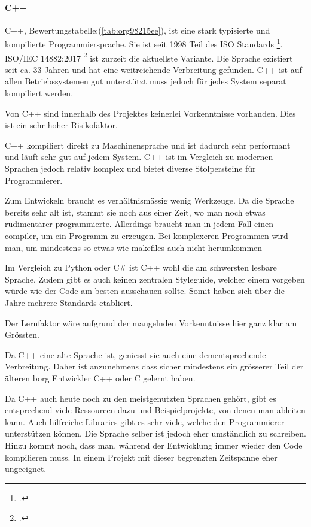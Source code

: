 \newpage
\paragraph{C++}
\label{sec:orga42458f}

C++, Bewertungstabelle:(\ref{tab:org98215ee}), ist eine stark typisierte und kompilierte Programmiersprache. Sie ist seit
1998 Teil des ISO Standards \footcite{cpp98}. ISO/IEC 14882:2017 \footcite{cpp17}
ist zurzeit die aktuellste Variante. Die Sprache existiert seit ca. 33 Jahren
und hat eine weitreichende Verbreitung gefunden. C++ ist auf allen
Betriebssystemen gut unterstützt muss jedoch für jedes System separat
kompiliert werden.

Von C++ sind innerhalb des Projektes keinerlei Vorkenntnisse vorhanden. Dies
ist ein sehr hoher Risikofaktor.

C++ kompiliert direkt zu Maschinensprache und ist dadurch sehr performant und
läuft sehr gut auf jedem System. C++ ist im Vergleich zu modernen Sprachen
jedoch relativ komplex und bietet diverse Stolpersteine für Programmierer.

Zum Entwickeln braucht es verhältnismässig wenig Werkzeuge. Da die Sprache
bereits sehr alt ist, stammt sie noch aus einer Zeit, wo man noch etwas
rudimentärer programmierte. Allerdings braucht man in jedem Fall einen
\gls{compiler}, um ein Programm zu erzeugen. Bei komplexeren Programmen wird man,
um mindestens so etwas wie \glspl{makefile} auch nicht herumkommen

Im Vergleich zu Python oder C\# ist C++ wohl die am schwersten lesbare Sprache.
Zudem gibt es auch keinen zentralen Styleguide, welcher einem vorgeben würde wie
der Code am besten ausschauen sollte. Somit haben sich über die Jahre mehrere
Standards etabliert.

Der Lernfaktor wäre aufgrund der mangelnden Vorkenntnisse hier ganz klar am
Grössten.

Da C++ eine alte Sprache ist, geniesst sie auch eine dementsprechende
Verbreitung. Daher ist anzunehmens dass sicher mindestens ein grösserer Teil der
älteren \gls{borg} Entwickler C++ oder C gelernt haben.

Da C++ auch heute noch zu den meistgenutzten Sprachen gehört, gibt es
entsprechend viele Ressourcen dazu und Beispielprojekte, von denen man ableiten
kann. Auch hilfreiche Libraries gibt es sehr viele, welche den Programmierer
unterstützen können. Die Sprache selber ist jedoch eher umständlich zu
schreiben. Hinzu kommt noch, dass man, während der Entwicklung immer wieder den
Code kompilieren muss. In einem Projekt mit dieser begrenzten Zeitspanne eher
ungeeignet.


